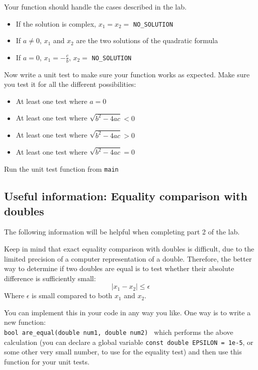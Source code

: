 \documentclass{article}
\begin{document}
Your function should handle the cases described in the lab.
\begin{itemize}
	\item If the solution is complex, $x_1=x_2=$ {\tt NO\_SOLUTION}
	\item If $a\neq0$, $x_1$ and $x_2$ are the two solutions of the quadratic formula
	\item If $a=0$, $x_1=-\frac{c}{b}$, $x_2=$ {\tt NO\_SOLUTION}
\end{itemize}
Now write a unit test to make sure your function works as expected. Make sure you test it for all the different possibilities:
\begin{itemize}
	\item At least one test where $a=0$
	\item At least one test where $\sqrt{b^2-4ac}<0$
	\item At least one test where $\sqrt{b^2-4ac}>0$
	\item At least one test where $\sqrt{b^2-4ac}=0$
\end{itemize}
Run the unit test function from {\tt{main}}

\subsection*{Useful information: Equality comparison with doubles}
The following information will be helpful when completing part 2 of the lab.

Keep in mind that exact equality comparison with doubles is difficult, due to the limited precision of a computer representation of a double. Therefore, the better way to determine if two doubles are equal is to test whether their absolute difference is sufficiently small:
\begin{equation*}
	|x_1-x_2|\leq \epsilon
\end{equation*}
Where $\epsilon$ is small compared to both $x_1$ and $x_2$.

You can implement this in your code in any way you like. One way is to write a new function:\\ {\tt bool are\_equal(double num1, double num2) } which performs the above calculation (you can declare a global variable {\tt const double EPSILON = 1e-5}, or some other very small number, to use for the equality test) and then use this function for your unit tests.
\end{document}
